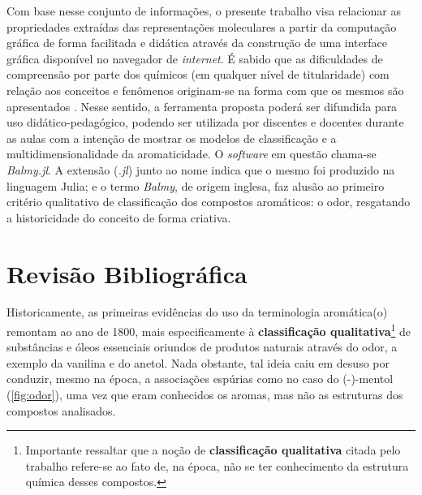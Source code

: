 Com base nesse conjunto de informações, o presente trabalho visa relacionar as propriedades extraídas das representações moleculares a partir da computação gráfica de forma facilitada e didática através da construção de uma interface gráfica disponível no navegador de \textit{internet}. É sabido que as dificuldades de compreensão por parte dos químicos (em qualquer nível de titularidade) com relação aos conceitos e fenômenos originam-se na forma com que os mesmos são apresentados \autocite{Cunha2018}. Nesse sentido, a ferramenta proposta poderá ser difundida para uso didático-pedagógico, podendo ser utilizada por discentes e docentes durante as aulas com a intenção de mostrar os modelos de classificação e a multidimensionalidade da aromaticidade. O \textit{software} em questão chama-se \textit{Balmy.jl}. A extensão (\textit{.jl}) junto ao nome indica que o mesmo foi produzido na linguagem Julia; e o termo \textit{Balmy}, de origem inglesa, faz alusão ao primeiro critério qualitativo de classificação dos compostos aromáticos: o odor, resgatando a historicidade do conceito de forma criativa.


\chapter{Revisão Bibliográfica}

Historicamente, as primeiras evidências do uso da terminologia aromática(o) remontam ao ano de 1800, mais especificamente à \textbf{classificação qualitativa}\footnote{Importante ressaltar que a noção de \textbf{classificação qualitativa} citada pelo trabalho refere-se ao fato de, na época, não se ter conhecimento da estrutura química desses compostos.} de substâncias e óleos essenciais oriundos de produtos naturais através do odor, a exemplo da vanilina e do anetol. Nada obstante, tal ideia caiu em desuso por conduzir, mesmo na época, a associações espúrias como no caso do (-)-mentol (\autoref{fig:odor}), uma vez que eram conhecidos os aromas, mas não as estruturas dos compostos analisados.

